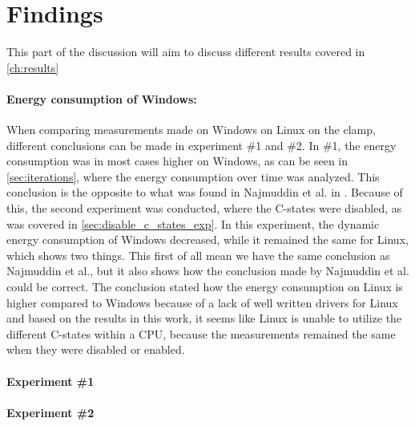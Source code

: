 \section{Findings}

This part of the discussion will aim to discuss different results covered in \cref{ch:results}

\paragraph*{Energy consumption of Windows:} When comparing measurements made on Windows on Linux on the clamp, different conclusions can be made in experiment \#1 and \#2. In \#1, the energy consumption was in most cases higher on Windows, as can be seen in \cref*{sec:iterations}, where the energy consumption over time was analyzed. This conclusion is the opposite to what was found in Najmuddin et al. in \cite*[]{Najmuddin2021}. Because of this, the second experiment was conducted, where the C-states were disabled, as was covered in \cref*{sec:disable_c_states_exp}. In this experiment, the dynamic energy consumption of Windows decreased, while it remained the same for Linux, which shows two things. This first of all mean we have the same conclusion as Najmuddin et al.\cite*[]{Najmuddin2021}, but it also shows how the conclusion made by Najmuddin et al.\cite*[]{Najmuddin2021} could be correct. The conclusion stated how the energy consumption on Linux is higher compared to Windows because of a lack of well written drivers for Linux and based on the results in this work, it seems like Linux is unable to utilize the different C-states within a CPU, because the measurements remained the same when they were disabled or enabled.

\paragraph*{Experiment \#1}

\paragraph*{Experiment \#2}
